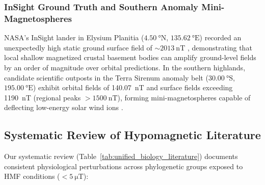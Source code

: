 \subsubsection{InSight Ground Truth and Southern Anomaly Mini-Magnetospheres}
NASA's InSight lander in Elysium Planitia ($\SI{4.50}{\degree}\text{N}$, $\SI{135.62}{\degree}\text{E}$) recorded an unexpectedly high static ground surface field of $\sim\SI{2013}{\nano\tesla}$ \citep{Johnson2020}, demonstrating that local shallow magnetized crustal basement bodies can amplify ground-level fields by an order of magnitude over orbital predictions. In the southern highlands, candidate scientific outposts in the Terra Sirenum anomaly belt ($\SI{30.00}{\degree}\text{S}$, $\SI{195.00}{\degree}\text{E}$) exhibit orbital fields of \SI{140.07}{\nano\tesla} and surface fields exceeding \SI{1190}{\nano\tesla} (regional peaks $> \SI{1500}{\nano\tesla}$), forming mini-magnetospheres capable of deflecting low-energy solar wind ions \citep{Mitchell2001}.



\subsection{Systematic Review of Hypomagnetic Literature}
Our systematic review (Table~\ref{tab:unified_biology_literature}) documents consistent physiological perturbations across phylogenetic groups exposed to HMF conditions ($<\SI{5}{\micro\tesla}$):

